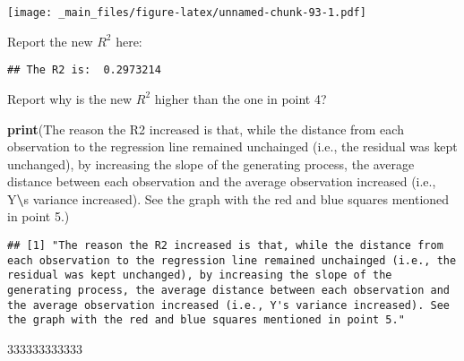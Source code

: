 \documentclass[
]{book}
\newenvironment{Shaded}{\begin{snugshade}}{\end{snugshade}}
\newcommand{\AttributeTok}[1]{\textcolor[rgb]{0.13,0.29,0.53}{#1}}
\newcommand{\FunctionTok}[1]{\textcolor[rgb]{0.13,0.29,0.53}{\textbf{#1}}}
\newcommand{\NormalTok}[1]{#1}
\newcommand{\OtherTok}[1]{\textcolor[rgb]{0.56,0.35,0.01}{#1}}
\newcommand{\SpecialCharTok}[1]{\textcolor[rgb]{0.81,0.36,0.00}{\textbf{#1}}}
\newcommand{\StringTok}[1]{\textcolor[rgb]{0.31,0.60,0.02}{#1}}
\begin{document}
\texttt{[image: \_main\_files/figure-latex/unnamed-chunk-93-1.pdf]}

Report the new \(R^2\) here:

\begin{Shaded}
\end{Shaded}

\begin{verbatim}
## The R2 is:  0.2973214
\end{verbatim}

Report why is the new \(R^2\) higher than the one in point 4?

\begin{Shaded}
\begin{Highlighting}[]
\FunctionTok{print}\NormalTok{(}\StringTok{\textquotesingle{}The reason the R2 increased is that, while the distance from each observation to the regression line remained unchainged (i.e., the residual was kept unchanged), by increasing the slope of the generating process, the average distance between each observation and the average observation increased (i.e., Y}\SpecialCharTok{\textbackslash{}\textquotesingle{}}\StringTok{s variance increased). See the graph with the red and blue squares mentioned in point 5.\textquotesingle{}}\NormalTok{)}
\end{Highlighting}
\end{Shaded}

\begin{verbatim}
## [1] "The reason the R2 increased is that, while the distance from each observation to the regression line remained unchainged (i.e., the residual was kept unchanged), by increasing the slope of the generating process, the average distance between each observation and the average observation increased (i.e., Y's variance increased). See the graph with the red and blue squares mentioned in point 5."
\end{verbatim}

333333333333
\end{document}
